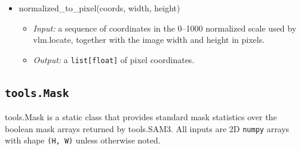 \documentclass{llmxive}
\providecommand{\apicode}[1]{#1}
\begin{document}
\begin{itemize}[leftmargin=1.5em]
  \begin{itemize}
  \item \emph{Input:} a \texttt{(H, W, 3)} or \texttt{(N, 3)} point cloud and a matching confidence array; thresholds and iteration count are optional.
  \item \emph{Output:} \texttt{(plane\_normal, inlier\_mask)} via RANSAC~\citep{fischler1981random}, or \texttt{(None, None)} when fitting fails. The sign of \texttt{plane\_normal} is unspecified and is disambiguated by the caller.
  \end{itemize}
\item \apicode{normalized_to_pixel(coords, width, height)}
  \begin{itemize}
  \item \emph{Input:} a sequence of coordinates in the 0--1000 normalized scale used by \apicode{vlm.locate}, together with the image width and height in pixels.
  \item \emph{Output:} a \texttt{list[float]} of pixel coordinates.
  \end{itemize}
\end{itemize}

\subsection{\texttt{tools.Mask}}
\label{app:tool_mask}
\apicode{tools.Mask} is a static class that provides standard mask statistics over the boolean mask arrays returned by \apicode{tools.SAM3}. All inputs are 2D \texttt{numpy} arrays with shape \texttt{(H, W)} unless otherwise noted.
\end{document}
